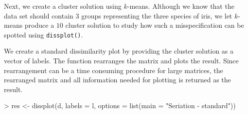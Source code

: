 \documentclass[fleqn, a4paper]{article}
\newcommand{\func}[1]{\mbox{\texttt{#1()}}}
\begin{document}
Next, we create a cluster solution using $k$-means. Although we know
that the data set should contain $3$ groups representing the three species
of iris, we let $k$-means produce a $10$ cluster solution to study how such a 
misspecification can be spotted using \func{dissplot}.


\begin{Schunk}
\end{Schunk}

We create a standard dissimilarity plot by providing the cluster
solution as a vector of labels. The function rearranges the matrix and
plots the result. Since rearrangement can be a time consuming procedure for
large matrices, the rearranged matrix and all
information needed for plotting is returned as the result. 

\begin{Schunk}
\begin{Sinput}
> res <- dissplot(d, labels = l, options = list(main = "Seriation - standard"))
\end{Sinput}
\end{Schunk}
\end{document}
